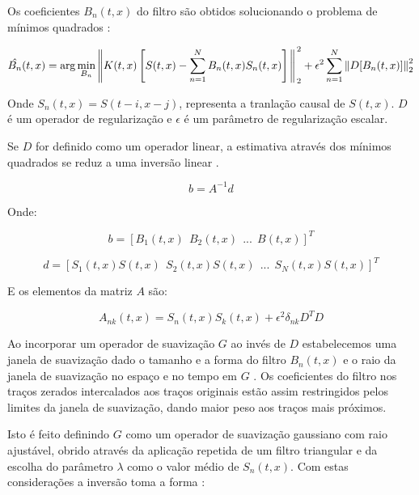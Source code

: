 Os coeficientes $B_n(t,x)$ do filtro são obtidos
solucionando o problema de mínimos quadrados \cite{liu11}:

\begin{equation}
\label{eq:4.1}
\hat{B_n}(t,x) = \arg \min_{B_n} \left \rVert K(t,x) \left [ S(t,x) - \sum^N_{n=1}B_n(t,x)S_n(t,x) \right ] \right \Arrowvert^2_2 
+ \epsilon^2 \sum^N_{n=1} \left \rVert D [ B_n(t,x) ] \right \Arrowvert^2_2
\end{equation}

Onde $S_n(t,x) = S(t-i,x-j)$, representa a tranlação causal de $S(t,x)$. 
$D$ é um operador de regularização e $\epsilon$ é um parâmetro de regularização escalar.

Se $D$ for definido como um operador linear, a estimativa através dos mínimos quadrados se reduz a uma
inversão linear \cite{liu11, fomel2009}.

\begin{equation}
\label{eq:4.2}
b = A^{-1} d
\end{equation}

Onde:

\begin{equation}
\label{eq:4.3}
 b = \left[ B_1(t,x)\:\: B_2(t,x)\:\: ...\:\: B(t,x) \right]^T
\end{equation}

\begin{equation}
\label{eq:4.4}
 d = \left[ S_1(t,x)S(t,x)\:\: S_2(t,x)S(t,x)\:\: ... \:\: S_N(t,x)S(t,x) \right]^T
\end{equation}

E os elementos da matriz $A$ são:

\begin{equation}
\label{eq:4.5}
 A_{nk}(t,x) = S_n(t,x)S_k(t,x) + \epsilon^2 \delta_{nk}D^TD
\end{equation}

Ao incorporar um operador de suavização $G$ ao invés de $D$ estabelecemos uma janela de suavização
dado o tamanho e a forma do filtro $B_n(t,x)$ e o raio da janela de suavização no espaço e no tempo em $G$ \cite{fomel2007}.
Os coeficientes do filtro nos traços zerados intercalados aos traços originais estão assim restringidos pelos limites
da janela de suavização, dando maior peso aos traços mais próximos.

Isto é feito definindo $G$ como um operador de suavização gaussiano com raio ajustável, obrido através da
aplicação repetida de um filtro triangular e da escolha do parâmetro $\lambda$ como o valor médio de $S_n(t,x)$.
Com estas considerações a inversão toma a forma \cite{liu11, fomel2007}:

